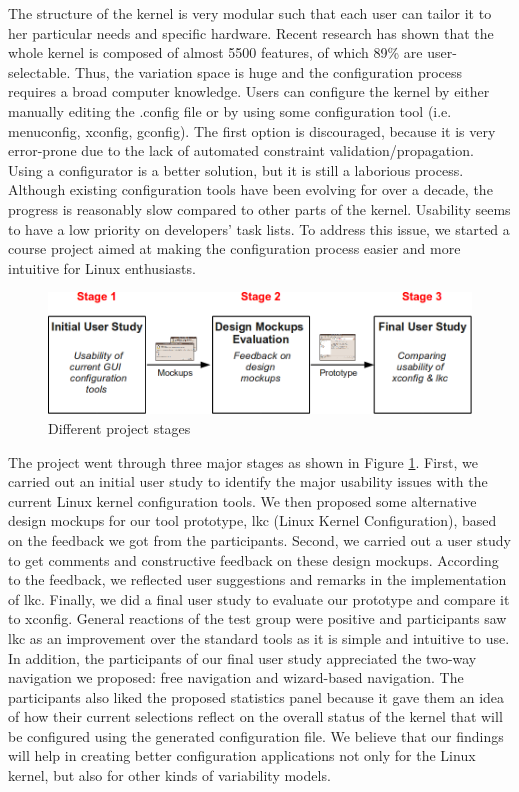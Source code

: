 \documentclass{chi2009}
\begin{document}
The structure of the kernel is very modular such that each user can tailor it to her particular needs and specific hardware. Recent research
\cite{she:kernel:2010} has shown that the whole kernel is composed of almost 5500 features, of which 89\% are user-selectable. Thus, the variation space is huge
and the configuration process requires a broad computer knowledge. Users can configure the kernel by either manually editing the \textsf{.config} file or by
using some configuration tool (i.e. \textsf{menuconfig, xconfig, gconfig}). The first option is discouraged, because it is very error-prone due to the lack of
automated constraint validation/propagation. Using a configurator is a better solution, but it is still a laborious process. Although existing configuration
tools have been evolving for over a decade, the progress is reasonably slow compared to other parts of the kernel. Usability seems to have a low priority on
developers' task lists. To address this issue, we started a course project aimed at making the configuration process easier and more intuitive for Linux
enthusiasts.

\begin{figure}[!t]
 \centering
 \includegraphics[scale=0.5,keepaspectratio=true]{figs/flow}
 \caption{Different project stages}
\label{fig:flow}
\end{figure}

The project went through three major stages as shown in Figure \ref{fig:flow}. First, we carried out an initial user study to identify the major usability
issues with the current Linux kernel configuration tools. We then proposed some alternative design mockups for our tool prototype, \textsf{lkc} (Linux Kernel
Configuration), based on the feedback we got from the participants. Second, we carried out a user study to get comments and constructive feedback on these
design mockups. According to the feedback, we reflected user suggestions and remarks in the implementation of \textsf{lkc}. Finally, we did a final user study
to evaluate our prototype and compare it to \textsf{xconfig}. General reactions of the test group were positive and participants saw \textsf{lkc} as an
improvement over the standard tools as it is simple and intuitive to use. In addition, the participants of our final user study appreciated the two-way
navigation we proposed: free navigation and wizard-based navigation. The participants also liked the proposed statistics panel because it gave them an idea of
how their current selections reflect on the overall status of the kernel that will be configured using the generated configuration file. We believe that our
findings will help in creating better configuration applications not only for the Linux kernel, but also for other kinds of variability models.
\end{document}
